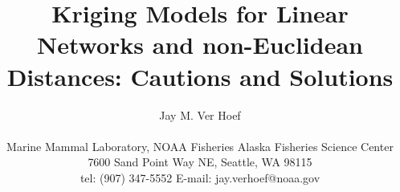 \documentclass[11pt, titlepage]{article}\usepackage[]{graphicx}\usepackage[]{color}
\begin{document}

\titlepage
\title {Kriging Models for Linear Networks and non-Euclidean Distances: Cautions and Solutions}
\author{Jay M. Ver Hoef \\
\hrulefill \\ 
Marine Mammal Laboratory, NOAA Fisheries Alaska Fisheries Science Center\\
7600 Sand Point Way NE, Seattle, WA 98115\\
tel: (907) 347-5552 \hspace{.5cm} E-mail: jay.verhoef@noaa.gov\\
\hrulefill \\
}

\maketitle
\end{document}
